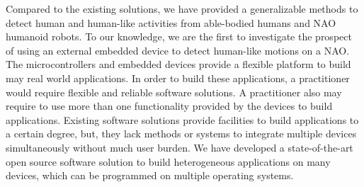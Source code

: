 \documentclass[letterpaper]{article}
\begin{document}
Compared to the existing solutions, we have provided a generalizable methods to detect human  and 
human-like activities from able-bodied humans and NAO humanoid robots. To our knowledge, we are the 
first to investigate the prospect of using an external embedded device to detect human-like motions 
on a NAO. The microcontrollers and embedded devices provide a flexible platform to 
build may real world applications. In order to build these applications, a practitioner would 
require  flexible and reliable software solutions. A practitioner also may require to use more than 
one functionality provided by the devices to build applications. Existing software solutions 
provide facilities to build applications to a certain degree, but, they lack methods or systems to 
integrate multiple devices simultaneously without much user burden. We have developed  
a state-of-the-art open source software solution to build heterogeneous applications on many 
devices, which can be programmed on multiple operating systems. 
\end{document}
